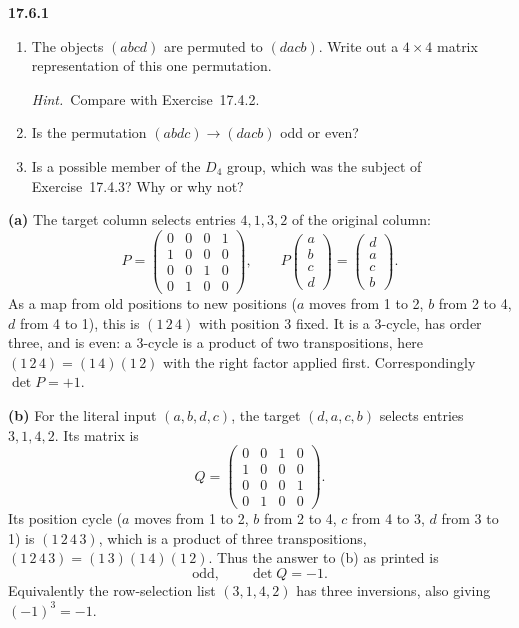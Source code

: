 \par\bigskip
\noindent\textbf{17.6.1}
\begin{enumerate}
\item[(a)] The objects $(abcd)$ are permuted to $(dacb)$. Write out a
$4\times4$ matrix representation of this one permutation.
\par\emph{Hint.}~Compare with Exercise~17.4.2.
\item[(b)] Is the permutation $(abdc)\to(dacb)$ odd or even?
\item[(c)] Is  a possible member of the $D_{4}$
group, which was the subject of Exercise~17.4.3? Why or why not?
\end{enumerate}
\par{}
\solution
\textbf{(a)} The target column selects entries $4,1,3,2$
of the original column:
\[
\boxed{P=\begin{pmatrix}
0&0&0&1\\1&0&0&0\\0&0&1&0\\0&1&0&0
\end{pmatrix}},\qquad
P\begin{pmatrix}a\\b\\c\\d\end{pmatrix}
=\begin{pmatrix}d\\a\\c\\b\end{pmatrix}.
\]
As a map from old positions to new positions ($a$ moves from 1 to 2,
$b$ from 2 to 4, $d$ from 4 to 1), this is
$(1\,2\,4)$ with position 3 fixed. It is a 3-cycle, has
order three, and is even: a 3-cycle is a product of two
transpositions, here $(1\,2\,4)=(1\,4)(1\,2)$ with the right factor
applied first. Correspondingly $\det P=+1$.

\textbf{(b)} 
For the literal input $(a,b,d,c)$, the target $(d,a,c,b)$
selects entries $3,1,4,2$. Its matrix is
\[
Q=\begin{pmatrix}
0&0&1&0\\1&0&0&0\\0&0&0&1\\0&1&0&0
\end{pmatrix}.
\]
Its position cycle ($a$ moves from 1 to 2, $b$ from 2 to 4,
$c$ from 4 to 3, $d$ from 3 to 1) is $(1\,2\,4\,3)$, which is a
product of three transpositions,
$(1\,2\,4\,3)=(1\,3)(1\,4)(1\,2)$. Thus the answer to (b) as printed is
\[
\boxed{\text{odd},\qquad \det Q=-1}.
\]
Equivalently the row-selection list $(3,1,4,2)$ has three
inversions, also giving $(-1)^3=-1$.

